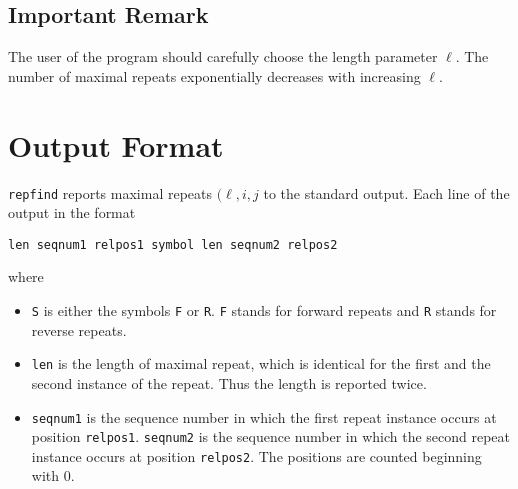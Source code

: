 \documentclass[12pt]{article}
\newcommand{\Repfind}[0]{\texttt{\small repfind}\xspace}
\begin{document}
\begin{Justshowoptions}







\end{Justshowoptions}

\subsection*{Important Remark}
The user of the program should carefully choose the length parameter \(\ell\).
The number of maximal repeats exponentially decreases with increasing
\(\ell\).

\section{Output Format}\label{Output}
\Repfind reports maximal repeats \((\ell,i,j\) to the standard output.
Each line of the output in the format

\begin{verbatim}
len seqnum1 relpos1 symbol len seqnum2 relpos2
\end{verbatim}

where
\begin{itemize}
\item
\texttt{S} is either the symbols \texttt{F} or \texttt{R}.
\texttt{F} stands for forward repeats and \texttt{R} stands for
reverse repeats.
\item
\texttt{len} is the length of maximal repeat, which is identical for
the first and the second instance of the repeat. Thus the length is
reported twice.
\item
\texttt{seqnum1} is the sequence number in which the first repeat instance
occurs  at position \texttt{relpos1}.
\texttt{seqnum2} is the sequence number in which the second repeat instance
occurs  at position \texttt{relpos2}. The positions are counted beginning with
0.
\end{itemize}
\end{document}
